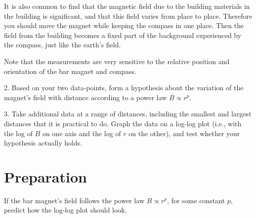 It is also common to find that the
magnetic field due to the building materials in the building is
significant, and that this field varies from place to place.  Therefore you
should move the magnet while keeping the compass in one place.  Then
the field from the building becomes a fixed part of the background
experienced by the compass, just like the earth's field. 

Note that the measurements are very sensitive to the
relative position and orientation of the bar magnet and
compass. 

2. Based on your two data-points, form a hypothesis about the variation
of the magnet's field with distance according to a power law $B\propto
r^p$. 

3. Take additional data at a range of distances, including the smallest
and largest distances that it is practical to do. Graph the data on a log-log
plot (i.e., with the log of $B$ on one axis and the log of $r$ on the other),
and test whether your hypothesis actually holds.

\section*{Preparation}

If the bar magnet's field follows the power law $B\propto r^p$, for some constant $p$,
predict how the log-log plot should look.



